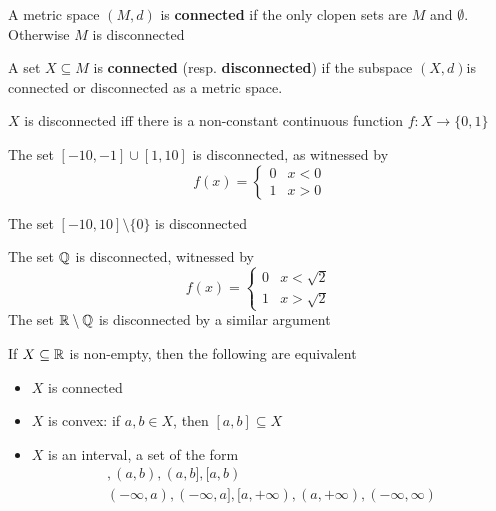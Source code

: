 \documentclass[11pt]{article}
\begin{document}
\begin{definition}[]
A metric space \((M,d)\) is \textbf{connected} if the only clopen sets are \(M\) and \(\emptyset\).
Otherwise \(M\) is disconnected
\end{definition}

\begin{definition}[]
A set \(X\subseteq M\) is \textbf{connected} (resp. \textbf{disconnected}) if the subspace \((X,d)\)is connected or
disconnected as a metric space.
\end{definition}

\begin{proposition}[]
\(X\) is disconnected iff there is a non-constant continuous function \(f:X\to\{0,1\}\)
\end{proposition}

\begin{examplle}[]
The set \([-10,-1]\cup[1,10]\) is disconnected, as witnessed by
\begin{equation*}
f(x)=
\begin{cases}
0&x<0\\
1&x>0
\end{cases}
\end{equation*}
\end{examplle}

\begin{examplle}[]
The set \([-10,10]\setminus\{0\}\) is disconnected
\end{examplle}

\begin{examplle}[]
The set \(\mathbb{Q}\) is disconnected, witnessed by
\begin{equation*}
f(x)=
\begin{cases}
0&x<\sqrt{2}\\
1&x>\sqrt{2}
\end{cases}
\end{equation*}
The set \(\mathbb{R}\setminus\mathbb{Q}\) is disconnected by a similar argument
\end{examplle}

\begin{proposition}[]
If \(X\subseteq\mathbb{R}\) is non-empty, then the following are equivalent
\begin{itemize}
\item \(X\) is connected
\item \(X\) is convex: if \(a,b\in X\), then \([a,b]\subseteq X\)
\item \(X\) is an interval, a set of the form
\begin{gather*}
[a,b],(a,b),(a,b],[a,b)\\
(-\infty,a),(-\infty,a],[a,+\infty),(a,+\infty),(-\infty,\infty)
\end{gather*}
\end{itemize}
\end{proposition}
\end{document}
